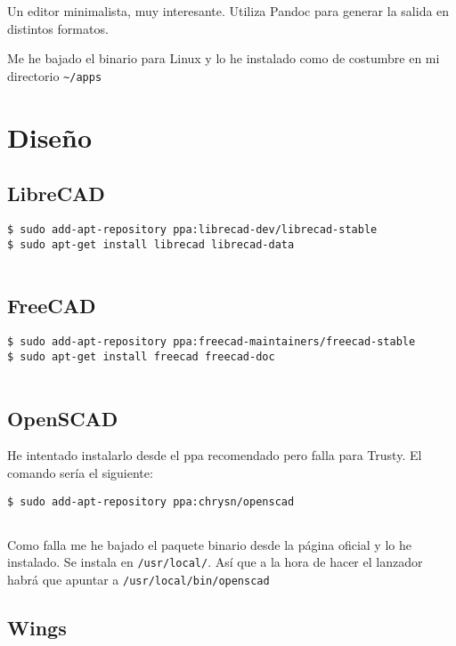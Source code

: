 Un editor minimalista, muy interesante. Utiliza Pandoc para generar la
salida en distintos formatos.

Me he bajado el binario para Linux y lo he instalado como de costumbre
en mi directorio \texttt{\textasciitilde{}/apps}

\section{Diseño}\label{diseuxf1o}

\subsection{LibreCAD}\label{librecad}

\begin{verbatim}
$ sudo add-apt-repository ppa:librecad-dev/librecad-stable
$ sudo apt-get install librecad librecad-data
      
\end{verbatim}

\subsection{FreeCAD}\label{freecad}

\begin{verbatim}
$ sudo add-apt-repository ppa:freecad-maintainers/freecad-stable
$ sudo apt-get install freecad freecad-doc
      
\end{verbatim}

\subsection{OpenSCAD}\label{openscad}

He intentado instalarlo desde el ppa recomendado pero falla para Trusty.
El comando sería el siguiente:

\begin{verbatim}
$ sudo add-apt-repository ppa:chrysn/openscad
      
\end{verbatim}

Como falla me he bajado el paquete binario desde la página oficial y lo
he instalado. Se instala en \texttt{/usr/local/}. Así que a la hora de
hacer el lanzador habrá que apuntar a \texttt{/usr/local/bin/openscad}

\subsection{Wings}\label{wings}

